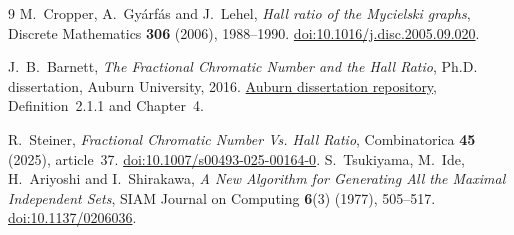 \documentclass[11pt,letterpaper]{article}
\theoremstyle{remark}
\begin{document}
\endgroup

\begin{thebibliography}{9}
M.~Cropper, A.~Gy\'arf\'as and J.~Lehel,
\emph{Hall ratio of the Mycielski graphs},
Discrete Mathematics \textbf{306} (2006), 1988--1990.
\href{https://doi.org/10.1016/j.disc.2005.09.020}{doi:10.1016/j.disc.2005.09.020}.

J.~B.~Barnett,
\emph{The Fractional Chromatic Number and the Hall Ratio},
Ph.D. dissertation, Auburn University, 2016.
\href{https://etd.auburn.edu/handle/10415/5316}{Auburn dissertation repository},
Definition~2.1.1 and Chapter~4.

R.~Steiner,
\emph{Fractional Chromatic Number Vs. Hall Ratio},
Combinatorica \textbf{45} (2025), article~37.
\href{https://doi.org/10.1007/s00493-025-00164-0}{doi:10.1007/s00493-025-00164-0}.
S.~Tsukiyama, M.~Ide, H.~Ariyoshi and I.~Shirakawa,
\emph{A New Algorithm for Generating All the Maximal Independent Sets},
SIAM Journal on Computing \textbf{6}(3) (1977), 505--517.
\href{https://doi.org/10.1137/0206036}{doi:10.1137/0206036}.
\end{thebibliography}
\end{document}
